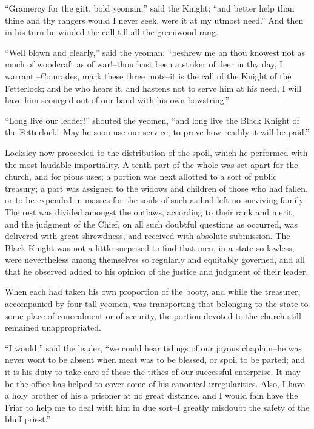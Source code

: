 ``Gramercy for the gift, bold yeoman,'' said the Knight; ``and better
help than thine and thy rangers would I never seek, were it at my utmost
need.'' And then in his turn he winded the call till all the greenwood
rang.

``Well blown and clearly,'' said the yeoman; ``beshrew me an thou
knowest not as much of woodcraft as of war!--thou hast been a striker of
deer in thy day, I warrant.--Comrades, mark these three mots--it is the
call of the Knight of the Fetterlock; and he who hears it, and hastens
not to serve him at his need, I will have him scourged out of our band
with his own bowstring.''

``Long live our leader!'' shouted the yeomen, ``and long live the Black
Knight of the Fetterlock!--May he soon use our service, to prove how
readily it will be paid.''

Locksley now proceeded to the distribution of the spoil, which he
performed with the most laudable impartiality. A tenth part of the whole
was set apart for the church, and for pious uses; a portion was next
allotted to a sort of public treasury; a part was assigned to the widows
and children of those who had fallen, or to be expended in masses for
the souls of such as had left no surviving family. The rest was divided
amongst the outlaws, according to their rank and merit, and the judgment
of the Chief, on all such doubtful questions as occurred, was delivered
with great shrewdness, and received with absolute submission. The Black
Knight was not a little surprised to find that men, in a state so
lawless, were nevertheless among themselves so regularly and equitably
governed, and all that he observed added to his opinion of the justice
and judgment of their leader.

When each had taken his own proportion of the booty, and while the
treasurer, accompanied by four tall yeomen, was transporting that
belonging to the state to some place of concealment or of security, the
portion devoted to the church still remained unappropriated.

``I would,'' said the leader, ``we could hear tidings of our joyous
chaplain--he was never wont to be absent when meat was to be blessed, or
spoil to be parted; and it is his duty to take care of these the tithes
of our successful enterprise. It may be the office has helped to cover
some of his canonical irregularities. Also, I have a holy brother of his
a prisoner at no great distance, and I would fain have the Friar to help
me to deal with him in due sort--I greatly misdoubt the safety of the
bluff priest.''

